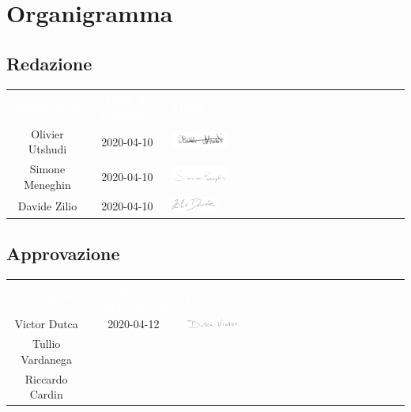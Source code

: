 \section{Organigramma}
\subsection{Redazione} 
\begin{table}[H]
	\begin{center}
	\begin{tabular}{ c c C{6.6cm} }
		\textcolor{white}{\textbf{Nominativo}} & \textcolor{white}{\textbf{Data di redazione}} & \textcolor{white}{\textbf{Firma}} \\
		Olivier Utshudi & 2020-04-10 & \includegraphics[scale=0.3, width=0.25\textwidth]{img/firme/outshudi.png}\\
		Simone Meneghin & 2020-04-10 & \includegraphics[scale=0.3, width=0.25\textwidth]{img/firme/meneghin.png}\\
		Davide Zilio & 2020-04-10 & \includegraphics[scale=0.2, width=0.2\textwidth]{img/firme/zilio.png}\\
	\end{tabular}
	\end{center}	
\end{table}

\subsection{Approvazione} 
\begin{table}[H]
	\begin{center}
	\begin{tabular}{ c c C{6cm} }
		\textcolor{white}{\textbf{Nominativo}} & \textcolor{white}{\textbf{Data di approvazione}} & \textcolor{white}{\textbf{Firma}} \\
		Victor Dutca & 2020-04-12 &  \includegraphics[scale=0.3, width=0.25\textwidth]{img/firme/dutca.png} \\
		Tullio Vardanega &  & \\
		Riccardo Cardin &  & \\
	\end{tabular}
	\end{center}	
\end{table}

